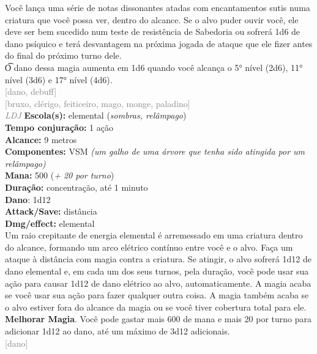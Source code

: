 \documentclass{RPG_Adventure}[2021/10/20]
\begin{document}
{\normalsize Você lança uma série de notas dissonantes atadas com encantamentos sutis numa criatura que você possa ver, dentro do alcance. Se o alvo puder ouvir você, ele deve ser bem sucedido num teste de resistência de Sabedoria ou sofrerá 1d6 de dano psíquico e terá desvantagem na próxima jogada de ataque que ele fizer antes do final do próximo turno dele.\\\t O dano dessa magia aumenta em 1d6 quando você alcança o 5° nível (2d6), 11° nível (3d6) e 17° nível (4d6).\\}
{\scriptsize \textcolor{gray}{[dano, debuff]\\}}
{\scriptsize \textcolor{gray}{[bruxo, clérigo, feiticeiro, mago, monge, paladino]\\}}
{\tiny \textcolor{gray}{\textit{LDJ}}}
{\small \t \textbf{Escola(s):} elemental (\textit{sombras, relâmpago})\\\t \textbf{Tempo conjuração:} 1 ação\\\t \textbf{Alcance:} 9 metros\\\t \textbf{Componentes:} VSM \textit{(um galho de uma árvore que tenha sido atingida por um relâmpago)}\\\t \textbf{Mana:} 500 (\textit{+ 20 por turno})\\\t \textbf{Duração:} concentração, até 1 minuto\\\t \textbf{Dano}: 1d12\\\t \textbf{Attack/Save:} distância\\\t \textbf{Dmg/effect:} elemental\\}
{\normalsize Um raio crepitante de energia elemental é arremessado em uma criatura dentro do alcance, formando um arco elétrico contínuo entre você e o alvo. Faça um ataque à distância com magia contra a criatura. Se atingir, o alvo sofrerá 1d12 de dano elemental e, em cada um dos seus turnos, pela duração, você pode usar sua ação para causar 1d12 de dano elétrico ao alvo, automaticamente. A magia acaba se você usar sua ação para fazer qualquer outra coisa. A magia também acaba se o alvo estiver fora do alcance da magia ou se você tiver cobertura total para ele.\\\t \textbf{Melhorar Magia}. Você pode gastar mais 600 de mana e mais 20 por turno para adicionar 1d12 ao dano, até um máximo de 3d12 adicionais.\\}
{\scriptsize \textcolor{gray}{[dano]\\}}
\end{document}
